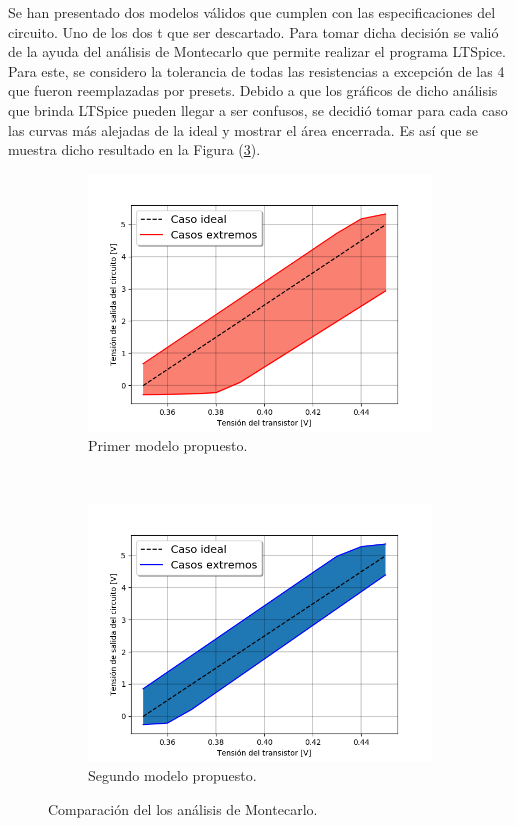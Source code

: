 \documentclass[a4paper]{article}
\begin{document}
Se han presentado dos modelos válidos que cumplen con las especificaciones del circuito. Uno de los dos t que ser descartado. Para tomar dicha decisión se valió de la ayuda del análisis de Montecarlo que permite realizar el programa LTSpice. Para este, se considero la tolerancia de todas las resistencias a excepción de las 4 que fueron reemplazadas por presets. Debido a que los gráficos de dicho análisis que brinda LTSpice pueden llegar a ser confusos, se decidió tomar para cada caso las curvas más alejadas de la ideal y mostrar el área encerrada. Es así que se muestra dicho resultado en la Figura (\ref{fig:mccomp}). 

\begin{figure}[H]
\centering
\begin{subfigure}{\textwidth}
  \centering
  \includegraphics[width=.8\linewidth]{Ejercicio6/Imagenes/MC-1M.png}
  \caption{Primer modelo propuesto.}
  \label{fig:mcm1}
\end{subfigure}
\\
\begin{subfigure}{\textwidth}
  \centering
  \includegraphics[width=.8\linewidth]{Ejercicio6/Imagenes/MC-2M.png}
  \caption{Segundo modelo propuesto.}
  \label{fig:mcm2}
\end{subfigure}
\caption{Comparación del los análisis de Montecarlo.}
\label{fig:mccomp}
\end{figure}
\end{document}
